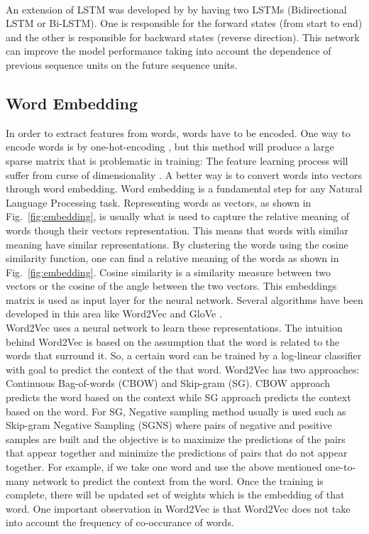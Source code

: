 \documentclass[sigconf, nonacm, natbib, screen, balance=False]{acmart}
\begin{document}
\hfill\\
An extension of LSTM was developed by \citet{Schuster1997BidirectionalRN} by having two LSTMs (Bidirectional LSTM or Bi-LSTM). One is responsible for the forward states (from start to end) and the other is responsible for backward states (reverse direction). This network can improve the model performance taking into account the dependence of previous sequence units on the future sequence units. 

\subsection{Word Embedding}
In order to extract features from words, words have to be encoded. One way to encode words is by one-hot-encoding \citep{ohe}, but this method will produce a large sparse matrix that is problematic in training: The feature learning process will suffer from curse of dimensionality \citep{raschka2019python}. A better way is to convert words into vectors through word embedding. Word embedding is a fundamental step for any Natural Language Processing task. Representing words as vectors, as shown in Fig.~\ref{fig:embedding}, is usually what is used to capture the relative meaning of words though their vectors representation. This means that words with similar meaning have similar representations. By clustering the words using the cosine similarity function, one can find a relative meaning of the words as shown in Fig.~\ref{fig:embedding}. Cosine similarity is a similarity measure between two vectors or the cosine of the angle between the two vectors. This embeddings matrix is used as input layer for the neural network. Several algorithms have been developed in this area like Word2Vec \citep{word2vec} and GloVe \citep{glovepaper}. 
\hfill\\
Word2Vec uses a neural network to learn these representations. The intuition behind Word2Vec is based on the assumption that the word is related to the words that surround it. So, a certain word can be trained by a log-linear classifier with goal to predict the context of the that word. Word2Vec has two approaches: Continuous Bag-of-words (CBOW) and Skip-gram (SG). CBOW approach predicts the word based on the context while SG approach predicts the context based on the word. For SG, Negative sampling method usually is used such as Skip-gram Negative Sampling (SGNS) where pairs of negative and positive samples are built and the objective is to maximize the predictions of the pairs that appear together and minimize the predictions of pairs that do not appear together. For example, if we take one word and use the above mentioned one-to-many network to predict the context from the word. Once the training is complete, there will be updated set of weights which is the embedding of that word. One important observation in Word2Vec is that Word2Vec does not take into account the frequency of co-occurance of words. 
\end{document}
